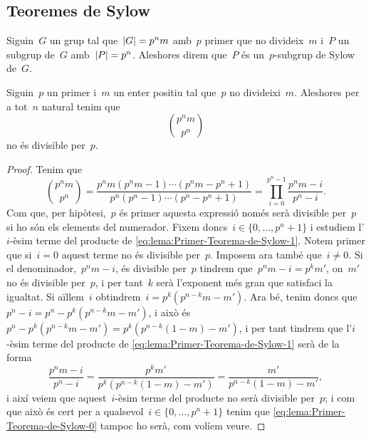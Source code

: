 \documentclass[../estructures-algebraiques.tex]{subfiles}
\begin{document}
    \subsection{Teoremes de Sylow}
    \begin{definition}
        \label{def:p-subgrup-de-Sylow}
        Siguin~\(G\) un grup tal que~\(\abs{G}=p^{n}m\) amb~\(p\) primer que no divideix~\(m\) i~\(P\) un subgrup de~\(G\) amb~\(\abs{P}=p^{n}\).
        Aleshores direm que~\(P\) és un~\(p\)-subgrup de Sylow de~\(G\).
    \end{definition}
    \begin{lemma}
        \label{lema:Primer-Teorema-de-Sylow}
        Siguin~\(p\) un primer i~\(m\) un enter positiu tal que~\(p\) no divideixi~\(m\).
        Aleshores per a tot~\(n\) natural tenim que
        \begin{equation}
            \label{eq:lema:Primer-Teorema-de-Sylow-0}
            \binom{p^{n}m}{p^{n}}
        \end{equation}
        no és divisible per~\(p\).
    \end{lemma}
    \begin{proof}
        Tenim que
        \begin{equation}
            \label{eq:lema:Primer-Teorema-de-Sylow-1}
            \binom{p^{n}m}{p^{n}}
            =\frac{p^{n}m(p^{n}m-1)\cdots(p^{n}m-p^{n}+1)}{p^{n}(p^{n}-1)\cdots(p^{n}-p^{n}+1)}=\prod_{i=0}^{p^{n}-1}\frac{p^{n}m-i}{p^{n}-i}.
        \end{equation}
        Com que, per hipòtesi,~\(p\) és primer aquesta expressió només serà divisible per~\(p\) si ho són els elements del numerador.
        Fixem doncs~\(i\in\{0,\dots,p^{n}+1\}\) i estudiem l'\(i\)-èsim terme del producte de \eqref{eq:lema:Primer-Teorema-de-Sylow-1}.
        Notem primer que si~\(i=0\) aquest terme no és divisible per~\(p\).
        Imposem ara també que~\(i\neq0\).
        Si el denominador,~\(p^{n}m-i\), és divisible per~\(p\) tindrem que~\(p^{n}m-i=p^{k}m'\), on~\(m'\) no és divisible per~\(p\), i per tant~\(k\) serà l'exponent més gran que satisfaci la igualtat.
        Si aïllem~\(i\) obtindrem~\(i=p^{k}(p^{n-k}m-m')\).
        Ara bé, tenim doncs que~\(p^{n}-i=p^{n}-p^{k}(p^{n-k}m-m')\), i això és~\(p^{n}-p^{k}(p^{n-k}m-m')=p^{k}(p^{n-k}(1-m)-m')\), i per tant tindrem que l'\(i\)-èsim terme del producte de \eqref{eq:lema:Primer-Teorema-de-Sylow-1} serà de la forma
        \[
            \frac{p^{n}m-i}{p^{n}-i}=\frac{p^{k}m'}{p^{k}(p^{n-k}(1-m)-m')}=\frac{m'}{p^{n-k}(1-m)-m'},
        \]
        i així veiem que aquest~\(i\)-èsim terme del producte no serà divisible per~\(p\); i com que això és cert per a qualsevol~\(i\in\{0,\dots,p^{n}+1\}\) tenim que \eqref{eq:lema:Primer-Teorema-de-Sylow-0} tampoc ho serà, com volíem veure.
    \end{proof}
\end{document}
